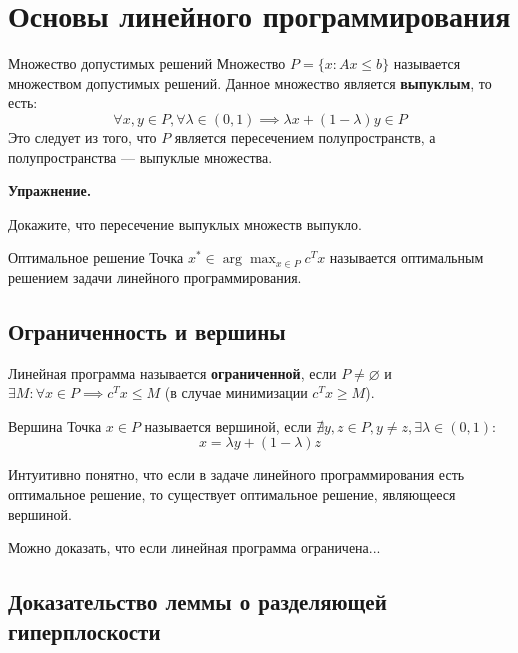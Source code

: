 
\section{Основы линейного программирования}

\newcommand{\exercise}{\par\noindent\textbf{Упражнение.}\par}

\begin{Definition}{Множество допустимых решений}{}
Множество $P = \{x : Ax \le b\}$ называется множеством допустимых решений. 
Данное множество является \textbf{выпуклым}, то есть:
\[
\forall x, y \in P, \forall \lambda \in (0, 1) \implies \lambda x + (1 - \lambda) y \in P
\]
Это следует из того, что $P$ является пересечением полупространств, а полупространства — выпуклые множества.
\end{Definition}

\exercise
Докажите, что пересечение выпуклых множеств выпукло.

\begin{Definition}{Оптимальное решение}{}
Точка $x^* \in \arg\max_{x \in P} c^T x$ называется оптимальным решением задачи линейного программирования.
\end{Definition}

\subsection{Ограниченность и вершины}

Линейная программа называется \textbf{ограниченной}, если $P \neq \varnothing$ и $\exists M : \forall x \in P \implies c^T x \le M$ (в случае минимизации $c^T x \ge M$).

\begin{Definition}{Вершина}{}
Точка $x \in P$ называется вершиной, если $\nexists y, z \in P, y \neq z, \exists \lambda \in (0, 1):$
\[
x = \lambda y + (1 - \lambda) z
\]
\end{Definition}

Интуитивно понятно, что если в задаче линейного программирования есть оптимальное решение, то существует оптимальное решение, являющееся вершиной.

\begin{Theorem}{}{}
Можно доказать, что если линейная программа ограничена...
\end{Theorem}

\subsection{Доказательство леммы о разделяющей гиперплоскости}

